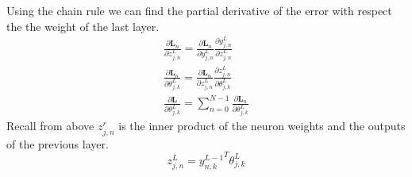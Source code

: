 \documentclass[]{article}
\begin{document}
Using the chain rule we can find the partial derivative of the error with respect the the weight of the last layer.
\begin{gather}
	\frac{\partial \textbf{L}_n}{\partial z^L_{j,n}} = \frac{\partial \textbf{L}_n}{\partial y^L_{j,n}} \frac{\partial y^L_{j,n}}{\partial z^L_{j,n}}\\
	\frac{\partial \textbf{L}_n}{\partial \theta^L_{j,k}} = \frac{\partial \textbf{L}_n}{\partial z^L_{j,n}}  \frac{\partial z^L_{j,n}}{\partial \theta^L_{j,k}}\\
	\frac{\partial \textbf{L}}{\partial \theta^L_{j,k}} = \sum_{n=0}^{N-1}\frac{\partial \textbf{L}_n}{\partial \theta^L_{j,k}}
\end{gather}
Recall from above $z^r_{j,n}$ is the inner product of the neuron weights and the outputs of the previous layer.
\begin{equation} 
z^L_{j,n} = {y^{L-1}_{n,k}}^T \theta^L_{j,k}
\end{equation}
\end{document}
